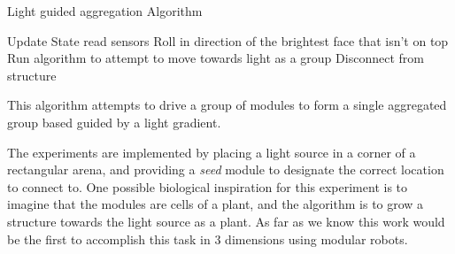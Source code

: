 \setcounter{algorithm}{1}
\begin{algorithm}[htbp] 
	\caption{Light guided aggregation Algorithm}
	\label{algorithmAggregate}
	\SetAlgoLined
	{
		Update State read sensors\;
		{
			Roll in direction of the brightest face that isn't on top\;
		}
		{
			Run algorithm to attempt to move towards light as a group\;
		}
		{
			Disconnect from structure
		}
	}
	\caption{This algorithm attempts to drive a group of modules to form a single aggregated group based guided by a light gradient.}
\end{algorithm}


The experiments are implemented by placing a light source in a corner of a rectangular arena, and providing a \emph{seed} module  to designate the correct location to connect to. One possible biological inspiration for this experiment is to imagine that the modules are cells of a plant, and the algorithm is to grow a structure towards the light source as a plant. As far as we know this work would be the first to accomplish this task in 3 dimensions using modular robots.
















%
%	
%	
%	

